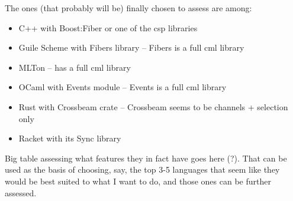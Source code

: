 
The ones (that probably will be) finally chosen to assess are among:
\begin{itemize}
\item C++ with Boost:Fiber or one of the \gls{csp} libraries
\item Guile Scheme with Fibers library -- Fibers is a full \gls{cml} library
\item MLTon -- has a full \gls{cml} library
\item OCaml with Events module -- Events is a full \gls{cml} library
\item Rust with Crossbeam crate -- Crossbeam seems to be channels + selection only
\item Racket with its Sync library
\end{itemize}

Big table assessing what features they in fact have goes here (?).  That can be used as the basis of choosing, say, the top 3-5 languages that seem like they would be best suited to what I want to do, and those ones can be further assessed.



